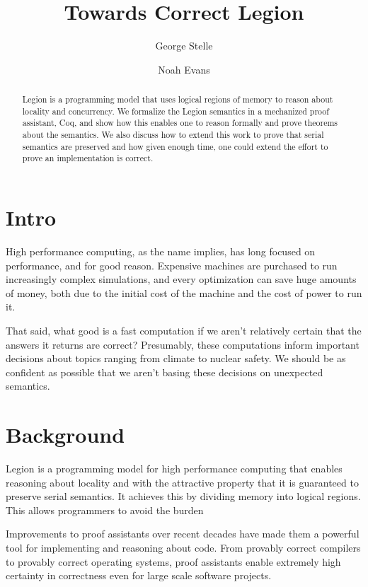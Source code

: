 \title{Towards Correct Legion}
\author{George Stelle  \and Noah Evans }

\begin{abstract}
Legion is a programming model that uses logical regions of memory to reason about 
locality and concurrency. We formalize the Legion semantics in a mechanized
proof assistant, Coq, and show how this enables one to reason formally and
prove theorems about the semantics. We also discuss how to extend this work to
prove that serial semantics are preserved and how given enough time, one could
extend the effort to prove an implementation is correct.
\end{abstract}

\section{Intro}
High performance computing, as the name implies, has long focused on
performance, and for good reason. Expensive machines are purchased to run
increasingly complex simulations, and every optimization can save huge amounts
of money, both due to the initial cost of the machine and the cost of power to
run it. 

That said, what good is a fast computation if we aren't relatively certain that
the answers it returns are correct? Presumably, these computations inform
important decisions about topics ranging from climate to nuclear safety. We
should be as confident as possible that we aren't basing these decisions on
unexpected semantics.

\section{Background}

Legion is a programming model for high performance computing that enables
reasoning about locality and with the attractive property that it is guaranteed
to preserve serial semantics. It achieves this by dividing memory into logical
regions.  This allows programmers to avoid the
burden 

Improvements to proof assistants over recent decades have made them a powerful
tool for implementing and reasoning about code. From provably correct compilers
to provably correct operating systems, proof assistants enable extremely high
certainty in correctness even for large scale software projects. 

